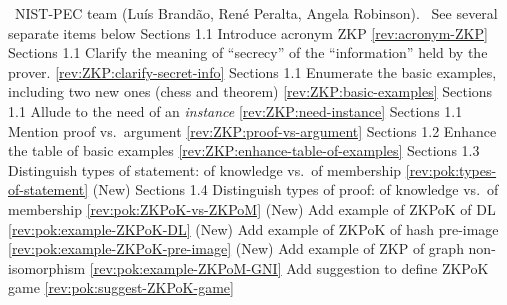 \newcol {}
\newcol \contributors\ NIST-PEC team (Luís Brandão, René Peralta, Angela Robinson).
				\Note\ See several separate items below
\newcol 
\rowendL
Sections 1.1
\newcol \newcol \newcol Introduce acronym ZKP
\newcol \ref{rev:acronym-ZKP}
\rowendL
Sections 1.1
\newcol \newcol \newcol Clarify the meaning of ``secrecy'' of the ``information'' held by the prover.
\newcol \ref{rev:ZKP:clarify-secret-info}
\rowendL
Sections 1.1
\newcol \newcol \newcol Enumerate the basic examples, including two new ones (chess and theorem)
\newcol \ref{rev:ZKP:basic-examples}
\rowendL
Sections 1.1
\newcol \newcol \newcol Allude to the need of an \emph{instance}
\newcol \ref{rev:ZKP:need-instance}
\rowendL
Sections 1.1
\newcol \newcol \newcol Mention proof vs.\ argument
\newcol \ref{rev:ZKP:proof-vs-argument}
\rowendL
Sections 1.2
\newcol \newcol \newcol Enhance the table of basic examples
\newcol \ref{rev:ZKP:enhance-table-of-examples}
\rowendL
Sections 1.3
\newcol \newcol \newcol Distinguish types of statement: of knowledge vs.\ of membership
\newcol \ref{rev:pok:types-of-statement}
\rowendL
(New) Sections 1.4
\newcol \newcol \newcol Distinguish types of proof: of knowledge vs.\ of membership
\newcol \ref{rev:pok:ZKPoK-vs-ZKPoM}
\rowendL
(New) 
\newcol \newcol \newcol Add example of ZKPoK of DL
\newcol \ref{rev:pok:example-ZKPoK-DL}
\rowendL
(New) 
\newcol \newcol \newcol Add example of ZKPoK of hash pre-image
\newcol \ref{rev:pok:example-ZKPoK-pre-image}
\rowendL
(New) 
\newcol \newcol \newcol Add example of ZKP of graph non-isomorphism
\newcol \ref{rev:pok:example-ZKPoM-GNI}
\rowendL
\newcol \newcol \newcol Add suggestion to define ZKPoK game
\newcol \ref{rev:pok:suggest-ZKPoK-game}
\rowendL
\myendIssue



